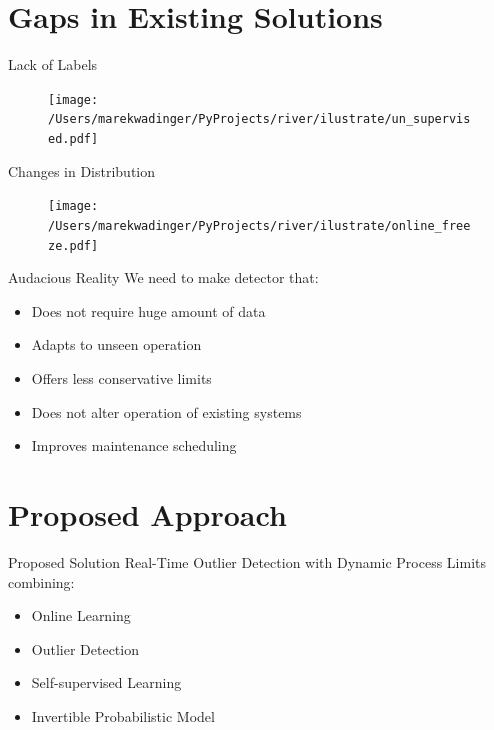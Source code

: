 \documentclass{beamer}
\begin{document}
\section{Gaps in Existing Solutions}

\begin{frame}{Lack of Labels}
    \begin{figure}[htpb]
        \begin{center}
            \texttt{[image: /Users/marekwadinger/PyProjects/river/ilustrate/un\_supervised.pdf]}
        \end{center}
    \end{figure}
\end{frame}

\begin{frame}{Changes in Distribution}
    \begin{figure}[htpb]
        \begin{center}
            \texttt{[image: /Users/marekwadinger/PyProjects/river/ilustrate/online\_freeze.pdf]}
        \end{center}
    \end{figure}
\end{frame}

\begin{frame}{Audacious Reality}
    We need to make detector that:
    \begin{itemize}
        \item Does not require huge amount of data
        \item Adapts to unseen operation
        \item Offers less conservative limits
        \item Does not alter operation of existing systems
        \item Improves maintenance scheduling
    \end{itemize}
\end{frame}


\section{Proposed Approach}

\begin{frame}{Proposed Solution}
    Real-Time Outlier Detection with Dynamic Process Limits
    combining:
    \begin{itemize}
        \item Online Learning
        \item Outlier Detection
        \item Self-supervised Learning
        \item Invertible Probabilistic Model
    \end{itemize}
\end{frame}
\end{document}
